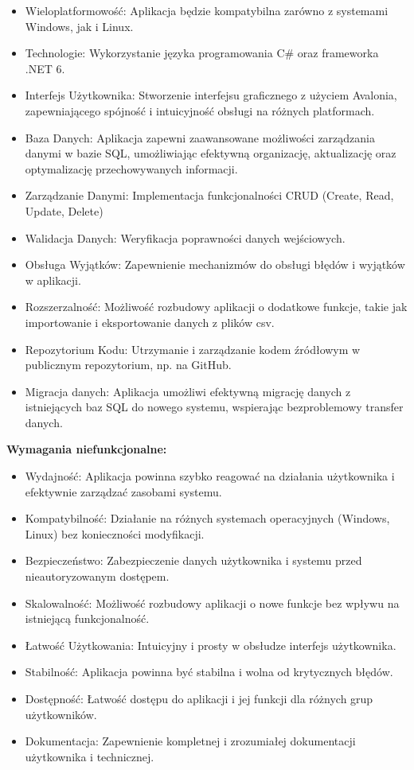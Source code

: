 \begin{itemize}
\item Wieloplatformowość: Aplikacja będzie kompatybilna zarówno z systemami Windows, jak i Linux.
\item Technologie: Wykorzystanie języka programowania C\# oraz frameworka .NET 6.
\item Interfejs Użytkownika: Stworzenie interfejsu graficznego z użyciem Avalonia, zapewniającego spójność i intuicyjność obsługi na różnych platformach.
\item Baza Danych: Aplikacja zapewni zaawansowane możliwości zarządzania danymi w bazie SQL, umożliwiając efektywną organizację, aktualizację oraz optymalizację przechowywanych informacji.
\item Zarządzanie Danymi: Implementacja funkcjonalności CRUD (Create, Read, Update, Delete) 
\item Walidacja Danych: Weryfikacja poprawności danych wejściowych.
\item Obsługa Wyjątków: Zapewnienie mechanizmów do obsługi błędów i wyjątków w aplikacji.
\item Rozszerzalność: Możliwość rozbudowy aplikacji o dodatkowe funkcje, takie jak importowanie i eksportowanie danych z plików csv.
\item Repozytorium Kodu: Utrzymanie i zarządzanie kodem źródłowym w publicznym repozytorium, np. na GitHub.
\item Migracja danych: Aplikacja umożliwi efektywną migrację danych z istniejących baz SQL do nowego systemu, wspierając bezproblemowy transfer danych.
\end{itemize}

\noindent \textbf{Wymagania niefunkcjonalne:}

\begin{itemize}
\item Wydajność: Aplikacja powinna szybko reagować na działania użytkownika i efektywnie zarządzać zasobami systemu.
\item Kompatybilność: Działanie na różnych systemach operacyjnych (Windows, Linux) bez konieczności modyfikacji.
\item Bezpieczeństwo: Zabezpieczenie danych użytkownika i systemu przed nieautoryzowanym dostępem.
\item Skalowalność: Możliwość rozbudowy aplikacji o nowe funkcje bez wpływu na istniejącą funkcjonalność.
\item Łatwość Użytkowania: Intuicyjny i prosty w obsłudze interfejs użytkownika.
\item Stabilność: Aplikacja powinna być stabilna i wolna od krytycznych błędów.
\item Dostępność: Łatwość dostępu do aplikacji i jej funkcji dla różnych grup użytkowników.
\item Dokumentacja: Zapewnienie kompletnej i zrozumiałej dokumentacji użytkownika i technicznej.
\end{itemize}

